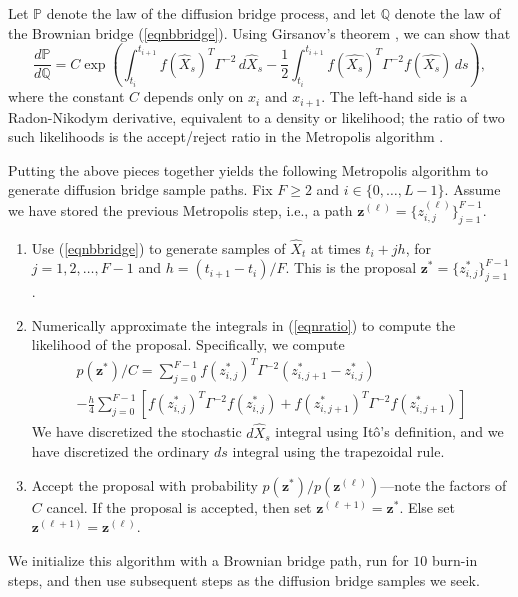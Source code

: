 \documentclass{article}
\newcommand{\bz}{\ensuremath{\mathbf{z}}}
\begin{document}
Let $\mathbb{P}$ denote the law of the diffusion bridge process, and let $\mathbb{Q}$ denote the law of the Brownian bridge (\ref{eqnbbridge}).  Using Girsanov's theorem \cite{papaspiliopoulos_importance_2012}, we can show that
\begin{equation}
\label{eqnratio}
\frac{d \mathbb{P}}{d \mathbb{Q}} = C \exp \left( \int_{t_i}^{t_{i+1}} f(\widehat{X}_s)^T \Gamma^{-2} \, d \widehat{X}_s - \frac{1}{2} \int_{t_i}^{t_{i+1}} f(\widehat{X_s})^T \Gamma^{-2} f(\widehat{X_s}) \, ds \right),
\end{equation}
where the constant $C$ depends only on $x_i$ and $x_{i+1}$.  The left-hand side is a Radon-Nikodym derivative, equivalent to a density or likelihood; the ratio of two such likelihoods is the accept/reject ratio in the Metropolis algorithm 
\cite{stuart_inverse_2010}.

Putting the above pieces together yields the following Metropolis algorithm to generate diffusion bridge sample paths.  Fix $F \geq 2$ and $i \in \{0, \ldots, L-1\}$.  Assume we have stored the previous Metropolis step, i.e., a path $\bz^{(\ell)} = \{z_{i,j}^{(\ell)}\}_{j=1}^{F-1}$.
\begin{enumerate}
\item Use (\ref{eqnbbridge}) to generate samples of $\widehat{X}_t$ at times $t_i + j h$, for $j = 1, 2, \ldots, F-1$ and $h = (t_{i+1} - t_i)/F$.  This is the proposal $\bz^\ast = \{z^\ast_{i,j}\}_{j=1}^{F-1}$.
\item Numerically approximate the integrals in (\ref{eqnratio}) to compute the likelihood of the proposal.  Specifically, we compute
\begin{multline*}
p(\bz^\ast)/C = \sum_{j=0}^{F-1} f(z^\ast_{i,j})^T \Gamma^{-2} (z^\ast_{i,j+1} - z^\ast_{i,j}) \\ - \frac{h}{4} \sum_{j=0}^{F-1} \left[ f(z^\ast_{i,j})^T \Gamma^{-2} f(z^\ast_{i,j}) + f(z^\ast_{i,j+1})^T \Gamma^{-2} f(z^\ast_{i,j+1}) \right]
\end{multline*}
We have discretized the stochastic $d\widehat{X}_s$ integral using It\^{o}'s definition, and we have discretized the ordinary $ds$ integral using the trapezoidal rule.
\item Accept the proposal with probability $p(\bz^\ast)/p(\bz^{(\ell)})$---note the factors of $C$ cancel.  If the proposal is accepted, then set $\bz^{(\ell+1)} = \bz^\ast$. Else set $\bz^{(\ell+1)} = \bz^{(\ell)}$.
\end{enumerate}
We initialize this algorithm with a Brownian bridge path, run for $10$ burn-in steps, and then use subsequent steps as the diffusion bridge samples we seek. 
\end{document}
